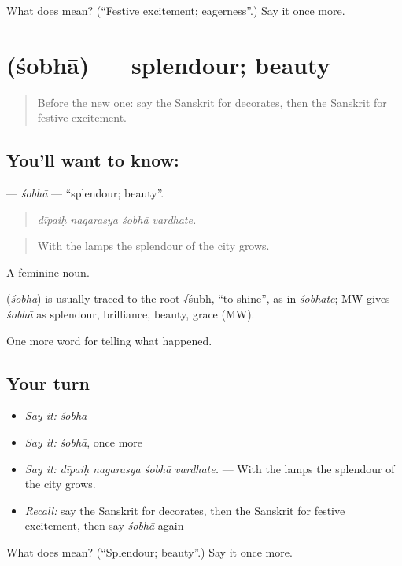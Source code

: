 \begin{tcolorbox}[breakable,colback=teal!4,colframe=teal!35!black,title={Before you move on}]
What does  mean? (\textquotedblleft{}Festive excitement; eagerness\textquotedblright{}.) Say it once more.
\end{tcolorbox}
\section[\texorpdfstring{\sk{शोभा} (śobhā)}{शोभा (śobhā)}]{ (śobhā) — splendour; beauty}

\label{lesson:SA-C326-sobha}



\begin{quote}
Before the new one: say the Sanskrit for decorates, then the Sanskrit for festive excitement.
\end{quote}

\subsection*{You'll want to know: }
\textbf{} — \emph{śobhā} — \textquotedblleft{}splendour; beauty\textquotedblright{}.

\begin{quote}
   
\end{quote}

\begin{quote}
\emph{dīpaiḥ nagarasya śobhā vardhate.}
\end{quote}

\begin{quote}
With the lamps the splendour of the city grows.
\end{quote}

A feminine noun.

\begin{cousinweb}
\textbf{} (\emph{śobhā}) is usually traced to the root √śubh, \textquotedblleft{}to shine\textquotedblright{}, as in \emph{śobhate}; MW gives \emph{śobhā} as splendour, brilliance, beauty, grace (MW).
\end{cousinweb}

\begin{grammarlens}[title={What you've built}]
One more word for telling what happened.
\end{grammarlens}

\subsection*{Your turn}
\begin{itemize}
\raggedright
  \item \emph{Say it:} \emph{śobhā}
  \item \emph{Say it:} \emph{śobhā}, once more
  \item \emph{Say it:} \emph{dīpaiḥ nagarasya śobhā vardhate.} — With the lamps the splendour of the city grows.
  \item \emph{Recall:} say the Sanskrit for decorates, then the Sanskrit for festive excitement, then say \emph{śobhā} again
\end{itemize}

\begin{tcolorbox}[breakable,colback=teal!4,colframe=teal!35!black,title={Before you move on}]
What does  mean? (\textquotedblleft{}Splendour; beauty\textquotedblright{}.) Say it once more.
\end{tcolorbox}

